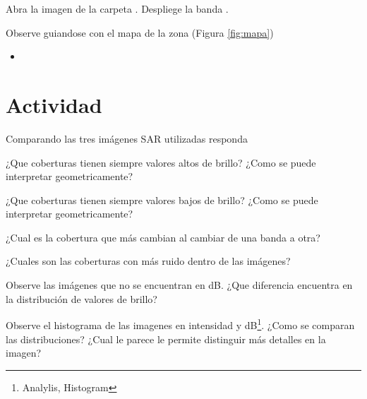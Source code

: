 Abra la imagen  de la carpeta . Despliege la banda .

Observe guiandose con el mapa de la zona (Figura \ref{fig:mapa})
\begin{itemize}
    \item
\end{itemize}

\section{Actividad}

Comparando las tres imágenes SAR utilizadas responda

\begin{que}
    ¿Que coberturas tienen siempre valores altos de brillo? ¿Como se puede interpretar geometricamente?
\end{que}

\begin{que}
    ¿Que coberturas tienen siempre valores bajos de brillo? ¿Como se puede interpretar geometricamente?
\end{que}

\begin{que}
    ¿Cual es la cobertura que más cambian al cambiar de una banda a otra?
\end{que}

\begin{que}
    ¿Cuales son las coberturas con más ruido dentro de las imágenes?
\end{que}

\begin{que}
    Observe las imágenes que no se encuentran en dB. ¿Que diferencia encuentra en la distribución de valores de brillo?
\end{que}

\begin{que}
    Observe el histograma de las imagenes en intensidad y dB\footnote{Analylis, Histogram}. ¿Como se comparan las distribuciones? ¿Cual le parece le permite distinguir más detalles en la imagen?
\end{que}
